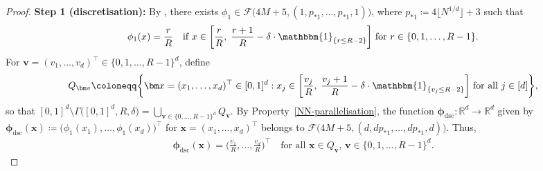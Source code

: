 \documentclass[12pt]{article}
\begin{document}
\begin{proof}
    \textbf{Step 1 (discretisation):}
    By \citet[Proposition~4.3]{lu2021deep}, there exists $\phi_1 \in \mathcal{F}\bigl(4M+5, (1, p_{*1}, \ldots, p_{*1}, 1) \bigr)$, where $p_{*1} \coloneqq 4\lfloor N^{1/d} \rfloor +3$ such that
    \begin{align*}
        \phi_1(x) = \frac{r}{R} \quad\text{if } x\in \biggl[ \frac{r}{R},\; \frac{r+1}{R} - \delta \cdot \mathbbm{1}_{\{r \leq R-2\}} \biggr] \text{ for } r\in \{0,1,\ldots,R-1\}.
    \end{align*}
    For $\bm v = (v_1,\ldots,v_d)^\top \in \{0,1,\ldots,R-1\}^d$, define
    \begin{align*}
        Q_{\bm v} \coloneqq \biggl\{\bm x = (x_1,\ldots,x_d)^\top \in [0,1]^d : x_j \in \biggl[ \frac{v_j}{R},\; \frac{v_j+1}{R} - \delta\cdot \mathbbm{1}_{\{v_j \leq R-2\}} \biggr] \text{ for all } j\in[d]\biggr\},
    \end{align*}
    so that $[0,1]^d \setminus \Gamma\bigl( [0,1]^d, R, \delta \bigr) = \bigcup_{\bm v \in \{0,\ldots,R-1\}^d} Q_{\bm v}$. By Property~\ref{NN-parallelisation}, the function $\bm \phi_{\mathrm{dsc}}:\mathbb{R}^d \rightarrow \mathbb{R}^d$ given by $\bm\phi_{\mathrm{dsc}}(\bm x) \coloneqq \bigl(\phi_1(x_1), \ldots, \phi_1(x_d)\bigr)^\top$ for $\bm{x} = (x_1,\ldots,x_d)^\top$ belongs to $\mathcal{F}\bigl(4M+5, (d, dp_{*1}, \ldots, dp_{*1}, d) \bigr)$.  Thus,
    \begin{align*}
        \bm\phi_{\mathrm{dsc}}(\bm x) = \biggl( \frac{v_1}{R}, \ldots, \frac{v_d}{R} \biggr)^\top \quad\text{for all } \bm x \in Q_{\bm v},\, \bm v \in \{0,1,\ldots,R-1\}^d. 
    \end{align*}


\end{proof}
\end{document}

